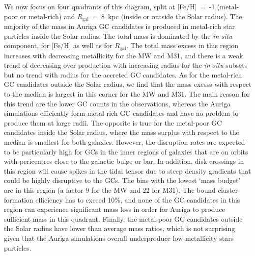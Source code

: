 \documentclass[a4paper,fleqn,usenatbib]{mnras}
\providecommand{\DIFadd}[1]{{\protect\color{blue}\uwave{#1}}} %
\providecommand{\DIFdel}[1]{{\protect\color{red}\sout{#1}}}                      %
\providecommand{\DIFaddbegin}{} %
\providecommand{\DIFaddend}{} %
\providecommand{\DIFdelbegin}{} %
\providecommand{\DIFdelend}{} %
\newcommand{\DIFscaledelfig}{0.5}
\newlength{\DIFdelgraphicswidth} %
\newlength{\DIFdelgraphicsheight} %
\newcommand{\DIFaddincludegraphics}[2][]{{\color{blue}\fbox{\DIFOincludegraphics[#1]{#2}}}} %
\newcommand{\DIFdelincludegraphics}[2][]{%
\sbox{\DIFdelgraphicsbox}{\DIFOincludegraphics[#1]{#2}}%
\settoboxwidth{\DIFdelgraphicswidth}{\DIFdelgraphicsbox} %
\settoboxtotalheight{\DIFdelgraphicsheight}{\DIFdelgraphicsbox} %
\scalebox{\DIFscaledelfig}{%
\parbox[b]{\DIFdelgraphicswidth}{\usebox{\DIFdelgraphicsbox}\\[-\baselineskip] \rule{\DIFdelgraphicswidth}{0em}}\llap{\resizebox{\DIFdelgraphicswidth}{\DIFdelgraphicsheight}{%
\setlength{\unitlength}{\DIFdelgraphicswidth}%
\begin{picture}(1,1)%
\thicklines\linethickness{2pt} %
{\color[rgb]{1,0,0}\put(0,0){\framebox(1,1){}}}%
{\color[rgb]{1,0,0}\put(0,0){\line( 1,1){1}}}%
{\color[rgb]{1,0,0}\put(0,1){\line(1,-1){1}}}%
\end{picture}%
}\hspace*{3pt}}} %
} %
\DeclareRobustCommand{\DIFaddbegin}{\DIFOaddbegin \let\includegraphics\DIFaddincludegraphics} %
\DeclareRobustCommand{\DIFaddend}{\DIFOaddend \let\includegraphics\DIFOincludegraphics} %
\DeclareRobustCommand{\DIFdelbegin}{\DIFOdelbegin \let\includegraphics\DIFdelincludegraphics} %
\DeclareRobustCommand{\DIFdelend}{\DIFOaddend \let\includegraphics\DIFOincludegraphics} %
\begin{document}
We now focus on four quadrants of this diagram, split at [Fe/H]~=~-1 (metal-poor 
or metal-rich) and \DIFdelbegin \DIFdel{$R_\text{gal}$}\DIFdelend \DIFaddbegin \DIFadd{$r_\text{gal}$}\DIFaddend ~=~8~kpc (inside or outside the Solar radius).
The majority of the mass in Auriga GC candidates is produced in metal-rich star
particles inside the Solar radius. The total mass is dominated by the {\it in situ} 
component, for [Fe/H] as well as for \DIFdelbegin \DIFdel{$R_\text{gal}$}\DIFdelend \DIFaddbegin \DIFadd{$r_\text{gal}$}\DIFaddend . The total mass excess in 
this region increases with decreasing metallicity for the MW and M31, and there
is a weak trend of decreasing over-production with increasing radius for the
{\it in situ} subsets but no trend with radius for the accreted GC candidates.
As for the metal-rich GC candidates outside the Solar radius, we find that the
mass excess with respect to the median is largest in this corner for the MW and
M31. The main reason for this trend are the lower GC counts in the observations,
whereas the Auriga simulations efficiently form metal-rich GC candidates and
have no problem to produce them at large radii. The opposite is true for the
metal-poor GC candidates inside the Solar radius, where the mass surplus with
respect to the median is smallest for both galaxies. However, the disruption rates
are expected to be particularly high for GCs in the inner regions of galaxies
that are on orbits with pericentres close to the galactic bulge or bar. In addition, 
disk crossings in this region will cause spikes in the tidal tensor due to steep
density gradients that could be highly disruptive to the GCs. The bins with the 
lowest `mass budget' are in this region (a factor 9 for the MW and 22 for M31).
The bound cluster formation efficiency has to exceed 10\%, and none of the GC 
candidates in this region can experience significant mass loss in order for Auriga
to produce sufficient mass in this quadrant. Finally, the metal-poor GC candidates
outside the Solar radius have lower than average mass ratios, which is not 
surprising given that the Auriga simulations overall underproduce low-metallicity
stars particles. 
\end{document}
